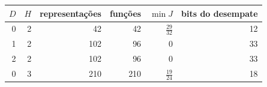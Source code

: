 \begin{tabular}{rrrrrr}
\toprule
$D$ & $H$ & representações & funções & $\min J$ & bits do desempate\\
\midrule
0 & 2 & 42 & 42 & $\frac{29}{32}$ & 12\\
1 & 2 & 102 & 96 & $0$ & 33\\
2 & 2 & 102 & 96 & $0$ & 33\\
0 & 3 & 210 & 210 & $\frac{19}{24}$ & 18\\
\bottomrule
\end{tabular}
